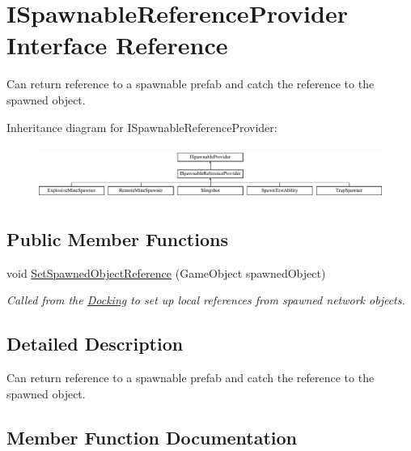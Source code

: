 \hypertarget{interface_i_spawnable_reference_provider}{}\section{I\+Spawnable\+Reference\+Provider Interface Reference}
\label{interface_i_spawnable_reference_provider}


Can return reference to a spawnable prefab and catch the reference to the spawned object.  


Inheritance diagram for I\+Spawnable\+Reference\+Provider\+:\begin{figure}[H]
\begin{center}
\leavevmode
\includegraphics[height=1.740933cm]{interface_i_spawnable_reference_provider}
\end{center}
\end{figure}
\subsection*{Public Member Functions}
\begin{DoxyCompactItemize}
\item 
void \hyperlink{interface_i_spawnable_reference_provider_a5a04dab53ce55b2011d30a97145d4325}{Set\+Spawned\+Object\+Reference} (Game\+Object spawned\+Object)
\begin{DoxyCompactList}\small\item\em Called from the \hyperlink{class_docking}{Docking} to set up local references from spawned network objects. \end{DoxyCompactList}\end{DoxyCompactItemize}


\subsection{Detailed Description}
Can return reference to a spawnable prefab and catch the reference to the spawned object. 



\subsection{Member Function Documentation}
\hypertarget{interface_i_spawnable_reference_provider_a5a04dab53ce55b2011d30a97145d4325}{}\label{interface_i_spawnable_reference_provider_a5a04dab53ce55b2011d30a97145d4325} 
